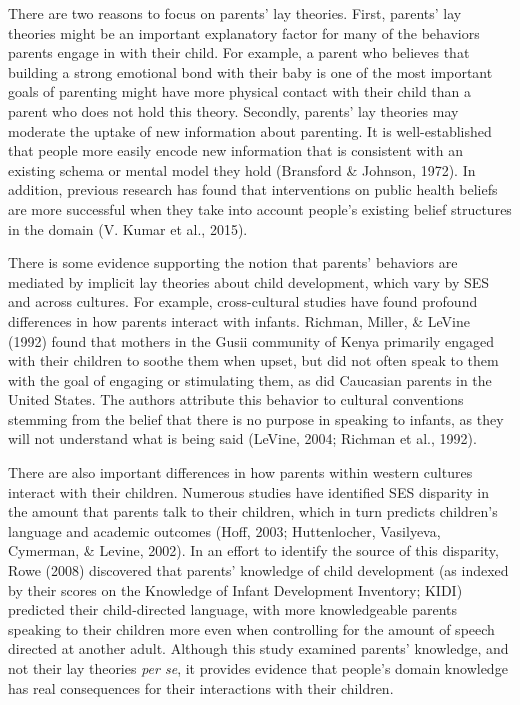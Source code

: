 \documentclass[10pt, letterpaper]{article}
\begin{document}
There are two reasons to focus on parents' lay theories. First, parents'
lay theories might be an important explanatory factor for many of the
behaviors parents engage in with their child. For example, a parent who
believes that building a strong emotional bond with their baby is one of
the most important goals of parenting might have more physical contact
with their child than a parent who does not hold this theory. Secondly,
parents' lay theories may moderate the uptake of new information about
parenting. It is well-established that people more easily encode new
information that is consistent with an existing schema or mental model
they hold (Bransford \& Johnson, 1972). In addition, previous research
has found that interventions on public health beliefs are more
successful when they take into account people's existing belief
structures in the domain (V. Kumar et al., 2015).

There is some evidence supporting the notion that parents' behaviors are
mediated by implicit lay theories about child development, which vary by
SES and across cultures. For example, cross-cultural studies have found
profound differences in how parents interact with infants. Richman,
Miller, \& LeVine (1992) found that mothers in the Gusii community of
Kenya primarily engaged with their children to soothe them when upset,
but did not often speak to them with the goal of engaging or stimulating
them, as did Caucasian parents in the United States. The authors
attribute this behavior to cultural conventions stemming from the belief
that there is no purpose in speaking to infants, as they will not
understand what is being said (LeVine, 2004; Richman et al., 1992).

There are also important differences in how parents within western
cultures interact with their children. Numerous studies have identified
SES disparity in the amount that parents talk to their children, which
in turn predicts children's language and academic outcomes (Hoff, 2003;
Huttenlocher, Vasilyeva, Cymerman, \& Levine, 2002). In an effort to
identify the source of this disparity, Rowe (2008) discovered that
parents' knowledge of child development (as indexed by their scores on
the Knowledge of Infant Development Inventory; KIDI) predicted their
child-directed language, with more knowledgeable parents speaking to
their children more even when controlling for the amount of speech
directed at another adult. Although this study examined parents'
knowledge, and not their lay theories \emph{per se}, it provides
evidence that people's domain knowledge has real consequences for their
interactions with their children.
\end{document}
